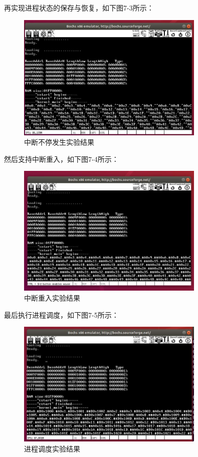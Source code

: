 再实现进程状态的保存与恢复，如下图7-3所示：
\begin{figure}[H]
  \centering
  \includegraphics[width=0.8\textwidth]{figures/chapter7/7-3.jpg}
  \caption{中断不停发生实验结果}
  \label{fig:3}
\end{figure}

然后支持中断重入，如下图7-4所示：
\begin{figure}[H]
  \centering
  \includegraphics[width=0.8\textwidth]{figures/chapter7/7-4.jpg}
  \caption{中断重入实验结果}
  \label{fig:4}
\end{figure}

最后执行进程调度，如下图7-5所示：
\begin{figure}[H]
  \centering
  \includegraphics[width=0.8\textwidth]{figures/chapter7/7-5.jpg}
  \caption{进程调度实验结果}
  \label{fig:5}
\end{figure}

